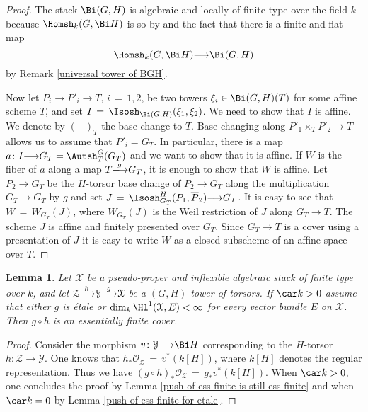 \documentclass[12pt,reqno]{amsart}
\theoremstyle{plain}
\newtheorem{lem}[thm]{Lemma}
\theoremstyle{definition}
\numberwithin{thm}{section}
\newcounter{x}\setcounter{x}{1}
\theoremstyle{plain}
\begin{document}
\begin{proof}
The stack $\Bi(G,H)$ is algebraic and locally of finite type over the field $k$ because 
$\Homsh_k(G,\Bi H)$ is so by \cite[Theorem 3]{HR} and the fact that there is a finite and 
flat map $$\Homsh_k(G,\Bi H){\longrightarrow} \Bi(G,H)$$ by Remark \ref{universal tower of BGH}.
 
Now let $P_i {\longrightarrow} P'_i {\longrightarrow} T$, $i\,=\,1,2$, be two towers $\xi_i \in \Bi(G,H)(T)$
for some affine scheme $T$, and set $I\,=\,\Isosh_{\Bi(G,H)}(\xi_1,\xi_2)$.  We need
to show that $I$ is affine. We denote by $(-)_T$ the base change to $T$. Base changing
along $P'_1\times_T P'_2 {\longrightarrow} T$ allows us to assume that $P'_i=G_T$. In particular,
there is a map $a\colon I{\longrightarrow} G_T=\Autsh^G_T(G_T)$ and we want to show that it is
affine. If $W$ is the fiber of $a$ along a map $T{\xlongrightarrow{g}} G_T$, it is enough to show
that $W$ is affine. Let $\overline P_2{\longrightarrow} G_T$ be the $H$-torsor base change of
$P_2{\longrightarrow} G_T$ along the multiplication $G_T{\longrightarrow} G_T$ by $g$ and set $J\,=\,
\Isosh^H_{G_T}(P_1,\overline P_2) {\longrightarrow} G_T$. It is easy to see that $W\,=\,W_{G_T}(J)$,
where $W_{G_T}(J)$ is the Weil restriction of $J$ along $G_T {\longrightarrow} T$. The scheme $J$
is affine and finitely presented over $G_T$. Since $G_T{\longrightarrow} T$ is a cover
using a presentation of $J$ it is easy to write $W$ as a closed subscheme of an
affine space over $T$.
\end{proof}

\begin{lem}\label{towers are ess finite}
Let ${\mathcal{X}}$ be a pseudo-proper and inflexible algebraic stack of finite type over 
$k$, and let ${\mathcal{Z}}{\xlongrightarrow{h}} {\mathcal{Y}}{\xlongrightarrow{g}} {\mathcal{X}}$ be a $(G,H)$-tower of torsors. If $\car k 
> 0$ assume that either $g$ is \'etale or $\dim_k \Hl^1({\mathcal{X}},E)<\infty$ for every
vector bundle $E$ on ${\mathcal{X}}$. Then $g\circ h$ is an essentially finite cover.
\end{lem}

\begin{proof} 
Consider the morphism $v\colon {\mathcal{Y}} {\longrightarrow} \Bi H$ corresponding to the $H$-torsor 
$h\colon {\mathcal{Z}} {\longrightarrow} {\mathcal{Y}}$. One knows that $h_* {\mathcal{O}_{\mathcal{Z}}}\,=\,v^* (k[H])$, where $k[H]$ 
denotes the regular representation. Thus we have $(g\circ h)_*{\mathcal{O}_{\mathcal{Z}}}\,=\,g_*v^* (k[H])$. 
When $\car k >0$, one concludes the proof by Lemma \ref{push of ess finite is still ess 
finite} and when $\car k =0$ by Lemma \ref{push of ess finite for etale}.
\end{proof}
\end{document}
